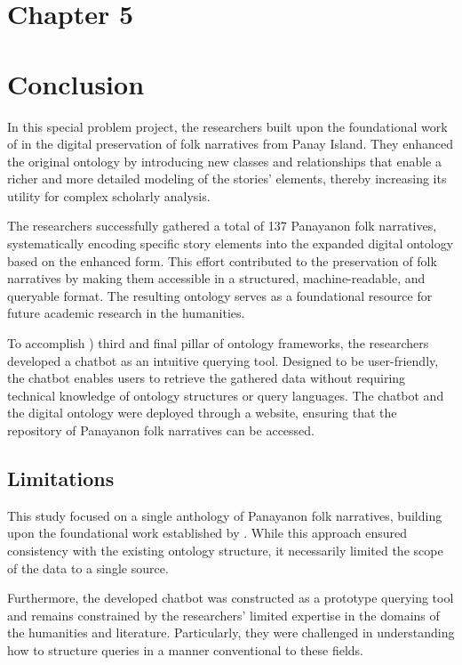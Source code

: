 \section*{Chapter 5}
\section{Conclusion}
    In this special problem project, the researchers built upon the foundational work of \cite{dimzonmyths} in the digital preservation of folk narratives from Panay Island. They enhanced the original ontology by introducing new classes and relationships that enable a richer and more detailed modeling of the stories' elements, thereby increasing its utility for complex scholarly analysis.
    
    The researchers successfully gathered a total of 137 Panayanon folk narratives, systematically encoding specific story elements into the expanded digital ontology based on the enhanced form. This effort contributed to the preservation of folk narratives by making them accessible in a structured, machine-readable, and queryable format. The resulting ontology serves as a foundational resource for future academic research in the humanities.

    To accomplish ) third and final pillar of ontology frameworks, the researchers developed a chatbot as an intuitive querying tool. Designed to be user-friendly, the chatbot enables users to retrieve the gathered data without requiring technical knowledge of ontology structures or query languages. The chatbot and the digital ontology were deployed through a website, ensuring that the repository of Panayanon folk narratives can be accessed. 

\subsection{Limitations}
     This study focused on a single anthology of Panayanon folk narratives, building upon the foundational work established by . While this approach ensured consistency with the existing ontology structure, it necessarily limited the scope of the data to a single source. 
     
     Furthermore, the developed chatbot was constructed as a prototype querying tool and remains constrained by the researchers' limited expertise in the domains of the humanities and literature. Particularly, they were challenged in understanding how to structure queries in a manner conventional to these fields.
    
